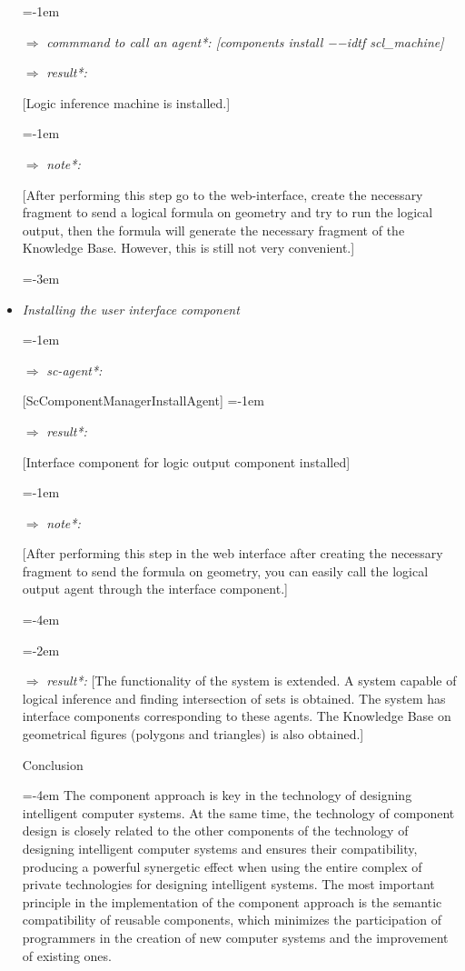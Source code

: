 \documentclass{article}
\begin{document}
\begin{multicols}{2}
\begin{itemize}
\leftskip=-1em
\item[$\Rightarrow$] \quad
\textit{commmand to call an agent*:
[components install −−idtf
scl\_machine]}
\item[$\Rightarrow$] \quad
\textit{result*:} \par
\leftskip=0pt
[Logic inference machine is installed.] \par
\leftskip=-1em
\item[$\Rightarrow$] \quad
\textit{note*:} \par
\leftskip=0pt
[After performing this step go to
the web-interface, create the necessary fragment to send a logical
formula on geometry and try to
run the logical output, then the
formula will generate the necessary fragment of the Knowledge
Base. However, this is still not
very convenient.] \par
\leftskip=-3em
\item\textit{Installing the user interface component} \par
\leftskip=-1em
\item[$\Rightarrow$] \quad
\textit{sc-agent*:} \par
\leftskip=0pt
[ScComponentManagerInstallAgent]
\leftskip=-1em
\item[$\Rightarrow$] \quad
\textit{result*:} \par
\leftskip=0pt
[Interface component for logic output component installed] \par
\leftskip=-1em
\item[$\Rightarrow$] \quad
\textit{note*:} \par
\leftskip=0pt
[After performing this step in the
web interface after creating the
necessary fragment to send the
formula on geometry, you can easily call the logical output agent
through the interface component.] \par
\leftskip=-4em
\rangle \par
\leftskip=-2em
\item[$\Rightarrow$] \quad
\leftskip=0pt
\setlength { \columnsep }{ 0.5cm }
\textit{result*:}
[The functionality of the system is extended. A system capable of logical inference and finding intersection of sets is obtained. The system has interface components corresponding to these agents.
The Knowledge Base on geometrical figures (polygons and triangles) is also obtained.]
\begin{center}
    Conclusion
\end{center}
\leftskip=-4em
The component approach is key in the technology
of designing intelligent computer systems. At the same
time, the technology of component design is closely
related to the other components of the technology of
designing intelligent computer systems and ensures their
compatibility, producing a powerful synergetic effect
when using the entire complex of private technologies for
designing intelligent systems. The most important principle in the implementation of the component approach
is the semantic compatibility of reusable components,
which minimizes the participation of programmers in the
creation of new computer systems and the improvement
of existing ones.


\end{itemize}
\end{multicols}
\end{document}
